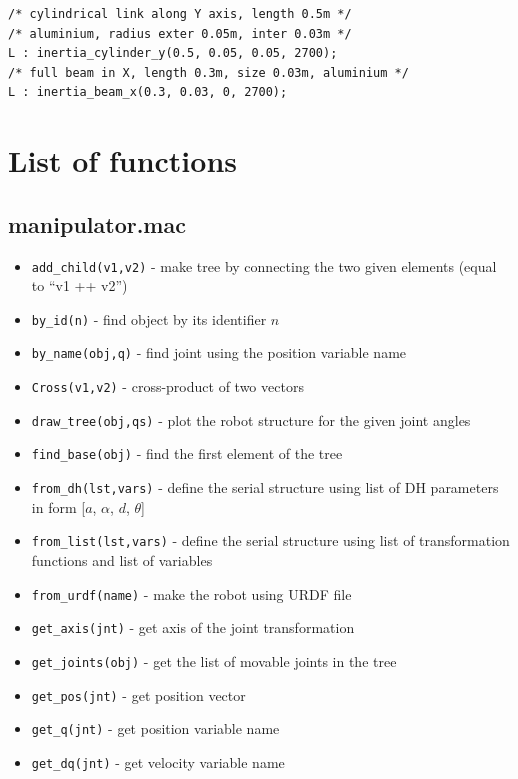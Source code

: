\documentclass{article}
\begin{document}
\begin{verbatim}
/* cylindrical link along Y axis, length 0.5m */
/* aluminium, radius exter 0.05m, inter 0.03m */
L : inertia_cylinder_y(0.5, 0.05, 0.05, 2700);
/* full beam in X, length 0.3m, size 0.03m, aluminium */
L : inertia_beam_x(0.3, 0.03, 0, 2700);
\end{verbatim}

\section{List of functions} 

\subsection{manipulator.mac}

\begin{itemize}
    \item \texttt{add\_child(v1,v2)} - make tree by connecting the two given elements (equal to ``v1 ++ v2'')
    \item \texttt{by\_id(n)} - find object by its identifier $n$
    \item \texttt{by\_name(obj,q)} - find joint using the position variable name
    \item \texttt{Cross(v1,v2)} - cross-product of two vectors
    \item \texttt{draw\_tree(obj,qs)} - plot the robot structure for the given joint angles 
    \item \texttt{find\_base(obj)} - find the first element of the tree
    \item \texttt{from\_dh(lst,vars)} - define the serial structure using list of DH parameters in form [$a$, $\alpha$, $d$, $\theta$]
    \item \texttt{from\_list(lst,vars)} - define the serial structure using list of transformation functions and list of variables
    \item \texttt{from\_urdf(name)} - make the robot using URDF file
    \item \texttt{get\_axis(jnt)} - get axis of the joint transformation
    \item \texttt{get\_joints(obj)} - get the list of movable joints in the tree
    \item \texttt{get\_pos(jnt)} - get position vector
    \item \texttt{get\_q(jnt)} - get position variable name 
    \item \texttt{get\_dq(jnt)} - get velocity variable name 

\end{itemize}
\end{document}
